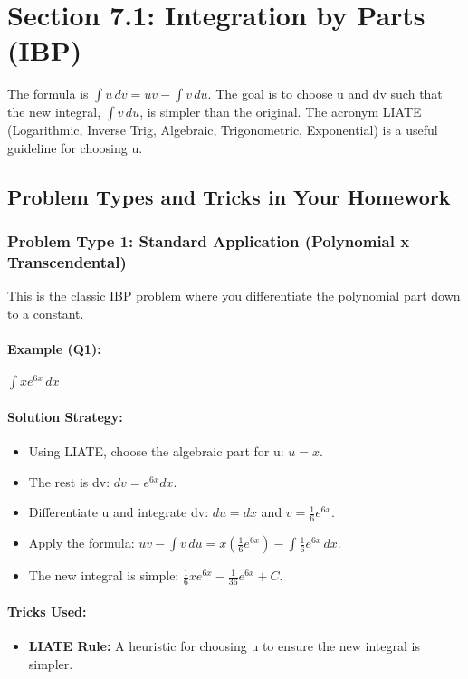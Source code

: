 \documentclass{article}
\begin{document}
\section{Section 7.1: Integration by Parts (IBP)}
The formula is $ \int u \,dv = uv - \int v \,du $. The goal is to choose u and dv such that the new integral, $\int v \,du$, is simpler than the original. The acronym LIATE (Logarithmic, Inverse Trig, Algebraic, Trigonometric, Exponential) is a useful guideline for choosing u.

\subsection{Problem Types and Tricks in Your Homework}
\subsubsection{Problem Type 1: Standard Application (Polynomial x Transcendental)}
This is the classic IBP problem where you differentiate the polynomial part down to a constant.
\paragraph{Example (Q1):} $ \int xe^{6x} \,dx $
\paragraph{Solution Strategy:}
\begin{itemize}
    \item Using LIATE, choose the algebraic part for u: $u=x$.
    \item The rest is dv: $dv = e^{6x}dx$.
    \item Differentiate u and integrate dv: $du=dx$ and $v=\frac{1}{6}e^{6x}$.
    \item Apply the formula: $uv - \int v \,du = x(\frac{1}{6}e^{6x}) - \int \frac{1}{6}e^{6x} \,dx$.
    \item The new integral is simple: $\frac{1}{6}xe^{6x} - \frac{1}{36}e^{6x} + C$.
\end{itemize}
\paragraph{Tricks Used:}
\begin{itemize}
    \item \textbf{LIATE Rule:} A heuristic for choosing u to ensure the new integral is simpler.
\end{itemize}
\end{document}
